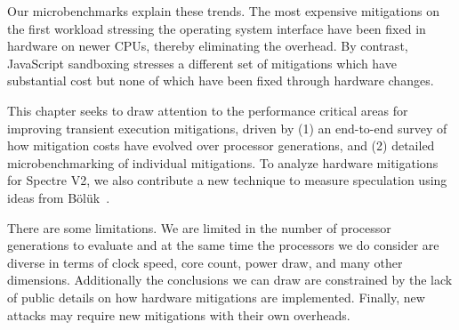 Our microbenchmarks explain these trends.
The most expensive mitigations on the first workload stressing the operating system interface have been fixed in hardware on newer CPUs, thereby eliminating the overhead.
By contrast, JavaScript sandboxing stresses a different set of mitigations which have substantial cost but none of which have been fixed through hardware changes.

This chapter seeks to draw attention to the performance critical areas for improving transient execution mitigations, driven by (1) an end-to-end survey of how mitigation costs have evolved over processor generations, and (2) detailed microbenchmarking of individual mitigations.
To analyze hardware mitigations for Spectre V2, we also contribute a new technique to measure speculation using ideas from Bölük~\cite{speculating-x86}.

There are some limitations.
We are limited in the number of processor generations to evaluate and at the same time the processors we do consider are diverse in terms of clock speed, core count, power draw, and many other dimensions.
Additionally the conclusions we can draw are constrained by the lack of public details on how hardware mitigations are implemented.  
Finally, new attacks may require new mitigations with their own overheads.




